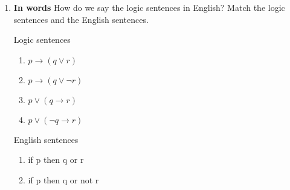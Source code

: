 \documentclass[a4,11pt]{article}
\newcommand{\6}{\mbox{$[\hspace*{-.6mm}[$}}
\newcommand{\9}{\mbox{$]\hspace*{-.6mm}]$}}
\begin{document}
\begin{enumerate}[leftmargin = 12pt]
Answer: If the English conditional sentence  {\em If the moon is made of green cheese, then I had yoghurt for breakfast} is analyzed using the material conditional, \ldots

\begin{enumerate}
\item \ldots then the conditional sentence is predicted to be true, because the antecedent is false. That does not make sense because native speakers would not judge the English conditional sentence to be true. (3 pts)

\item \ldots then the consequent is predicted to be true, because the antecedent is false. That does not make sense because the consequent does not have to be true.  (0 pts)

\end{enumerate}

{ \bf Model answer:}  Answer (a) is correct. If the English conditional sentence  {\em If the moon is made of green cheese, then I had yoghurt for breakfast} is analyzed using the material conditional, then the conditional sentence is predicted to be true because the antecedent is false, and that does not accord with native speaker intuitions. Answer (b) is incorrect because the consequent is not predicted to be true; rather, the consequent can be true or false if the antecedent is false.

\item {\bf  In words} How do we say the logic sentences in English? Match the logic sentences and the English sentences.

Logic sentences

\begin{enumerate}
\item $p \rightarrow (q \vee r)$

\item $p \rightarrow (q \vee \neg r)$

\item $p \vee (q \rightarrow r)$

\item $p \vee (\neg q \rightarrow r)$

\end{enumerate}

English sentences

\begin{enumerate}
\item if p then q or r

\item if p then q or not r


\end{enumerate}
\end{enumerate}
\end{document}
